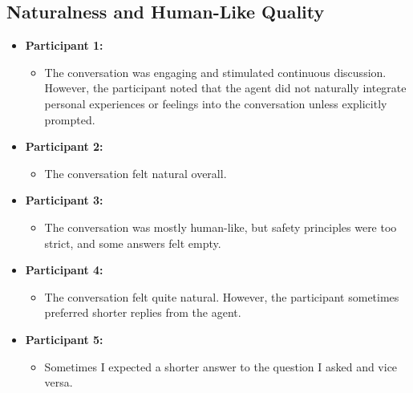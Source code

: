 \documentclass{article}
\begin{document}
\subsection{Naturalness and Human-Like Quality}
\begin{itemize}
    \item \textbf{Participant 1:}
    \begin{itemize}
        \item The conversation was engaging and stimulated continuous discussion. However, the participant noted that the agent did not naturally integrate personal experiences or feelings into the conversation unless explicitly prompted.
    \end{itemize}
    \item \textbf{Participant 2:}
    \begin{itemize}
        \item The conversation felt natural overall.
    \end{itemize}
    \item \textbf{Participant 3:}
    \begin{itemize}
        \item The conversation was mostly human-like, but safety principles were too strict, and some answers felt empty.
    \end{itemize}
    \item \textbf{Participant 4:}
    \begin{itemize}
        \item The conversation felt quite natural. However, the participant sometimes preferred shorter replies from the agent.
    \end{itemize}
        \item \textbf{Participant 5:}
    \begin{itemize}
        \item Sometimes I expected a shorter answer to the question I asked and vice versa.
    \end{itemize}
\end{itemize}
\end{document}

